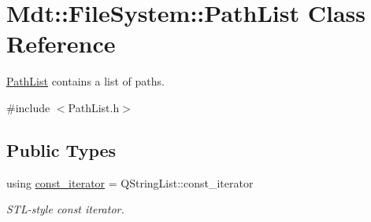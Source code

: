 \hypertarget{class_mdt_1_1_file_system_1_1_path_list}{}\section{Mdt\+:\+:File\+System\+:\+:Path\+List Class Reference}
\label{class_mdt_1_1_file_system_1_1_path_list}


\hyperlink{class_mdt_1_1_file_system_1_1_path_list}{Path\+List} contains a list of paths.  




{\ttfamily \#include $<$Path\+List.\+h$>$}

\subsection*{Public Types}
\begin{DoxyCompactItemize}
\item 
using \hyperlink{class_mdt_1_1_file_system_1_1_path_list_a16481fc90e2859c52398bd361fb69cec}{const\+\_\+iterator} = Q\+String\+List\+::const\+\_\+iterator\hypertarget{class_mdt_1_1_file_system_1_1_path_list_a16481fc90e2859c52398bd361fb69cec}{}\label{class_mdt_1_1_file_system_1_1_path_list_a16481fc90e2859c52398bd361fb69cec}

\begin{DoxyCompactList}\small\item\em S\+T\+L-\/style const iterator. \end{DoxyCompactList}\end{DoxyCompactItemize}
